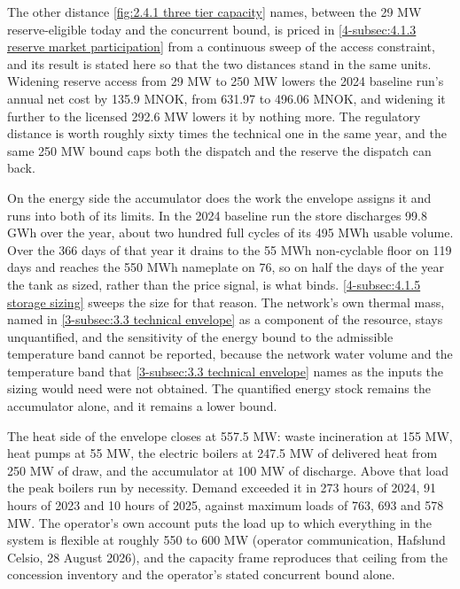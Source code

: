The other distance \autoref{fig:2.4.1 three tier capacity} names, between the 29 MW reserve-eligible today and the concurrent bound, is priced in \autoref{4-subsec:4.1.3 reserve market participation} from a continuous sweep of the access constraint, and its result is stated here so that the two distances stand in the same units. Widening reserve access from 29 MW to 250 MW lowers the 2024 baseline run's annual net cost by 135.9 MNOK, from 631.97 to 496.06 MNOK, and widening it further to the licensed 292.6 MW lowers it by nothing more. The regulatory distance is worth roughly sixty times the technical one in the same year, and the same 250 MW bound caps both the dispatch and the reserve the dispatch can back.

On the energy side the accumulator does the work the envelope assigns it and runs into both of its limits. In the 2024 baseline run the store discharges 99.8 GWh over the year, about two hundred full cycles of its 495 MWh usable volume. Over the 366 days of that year it drains to the 55 MWh non-cyclable floor on 119 days and reaches the 550 MWh nameplate on 76, so on half the days of the year the tank as sized, rather than the price signal, is what binds. \autoref{4-subsec:4.1.5 storage sizing} sweeps the size for that reason. The network's own thermal mass, named in \autoref{3-subsec:3.3 technical envelope} as a component of the resource, stays unquantified, and the sensitivity of the energy bound to the admissible temperature band cannot be reported, because the network water volume and the temperature band that \autoref{3-subsec:3.3 technical envelope} names as the inputs the sizing would need were not obtained. The quantified energy stock remains the accumulator alone, and it remains a lower bound.

The heat side of the envelope closes at 557.5 MW: waste incineration at 155 MW, heat pumps at 55 MW, the electric boilers at 247.5 MW of delivered heat from 250 MW of draw, and the accumulator at 100 MW of discharge. Above that load the peak boilers run by necessity. Demand exceeded it in 273 hours of 2024, 91 hours of 2023 and 10 hours of 2025, against maximum loads of 763, 693 and 578 MW. The operator's own account puts the load up to which everything in the system is flexible at roughly 550 to 600 MW (operator communication, Hafslund Celsio, 28 August 2026), and the capacity frame reproduces that ceiling from the concession inventory and the operator's stated concurrent bound alone.

